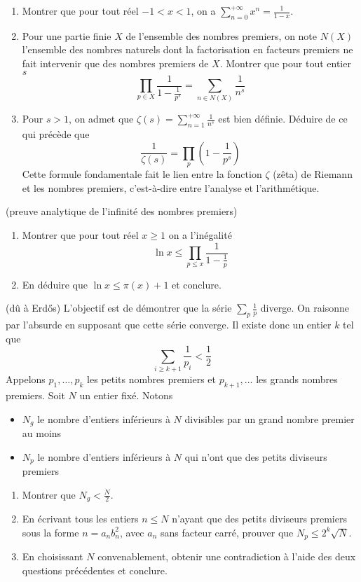 \begin{exo}
\begin{enumerate}
	\item Montrer que pour tout réel $-1 < x < 1$, on a 
	$\displaystyle\sum_{n=0}^{+\infty} x^n = \frac{1}{1-x} $.
	\item Pour une partie finie $X$ de l'ensemble des nombres premiers, on note $N(X)$ l'ensemble des nombres naturels dont la factorisation en facteurs premiers ne fait intervenir que des nombres premiers de $X$. Montrer que pour tout entier $s$
	\[ \prod_{p \in X} \frac{1}{1-\frac{1}{p^s}} = \sum_{n \in N(X)} \frac{1}{n^s} \]
	\item Pour $s > 1$, on admet que $\zeta(s) = \displaystyle\sum_{n=1}^{+\infty} \frac{1}{n^s}$ est bien définie. Déduire de ce qui précède que
	\[ \frac{1}{\zeta(s)} = \prod_{p} \left(1-\frac{1}{p^s}\right) \]
	Cette formule fondamentale fait le lien entre la fonction $\zeta$ (\og zêta\fg{}) de Riemann et les nombres premiers, c'est-à-dire entre l'analyse et l'arithmétique.
\end{enumerate}
\end{exo}


\begin{exo}(preuve analytique de l'infinité des nombres premiers)
\begin{enumerate}
	\item Montrer que pour tout réel $x \geq 1$ on a l'inégalité
	\[ \ln x \leq \prod_{p \leq x} \frac{1}{1-\frac{1}{p}} \]
	\item En déduire que $\ln x \leq \pi(x) + 1$ et conclure.
\end{enumerate}
\end{exo}


\begin{exo}(dû à Erd\H{o}s)
L'objectif est de démontrer que la série $\displaystyle\sum_{p} \frac{1}{p}$ diverge. On raisonne par l'absurde en supposant que cette série converge. Il existe donc un entier $k$ tel que
\[ \sum_{i \geq k+1} \frac{1}{p_i} < \frac{1}{2} \]
Appelons $p_1, \dots, p_k$ les \og petits \fg{} nombres premiers et $p_{k+1}, \dots$ les \og grands \fg{} nombres premiers. Soit $N$ un entier fixé. Notons
\begin{itemize}
	\item $N_g$ le nombre d'entiers inférieurs à $N$ divisibles par un grand nombre premier au moins
	\item $N_p$ le nombre d'entiers inférieurs à $N$ qui n'ont que des petits diviseurs premiers
\end{itemize}
\begin{enumerate}
	\item Montrer que $N_g < \frac{N}{2}$.
	\item En écrivant tous les entiers $n \leq N$ n'ayant que des petits diviseurs premiers sous la forme $n = a_nb_n^2$, avec $a_n$ sans facteur carré, prouver que $N_p \leq 2^k \sqrt{N}$.
	\item En choisissant $N$ convenablement, obtenir une contradiction à l'aide des deux questions précédentes et conclure.
\end{enumerate}
\end{exo}


